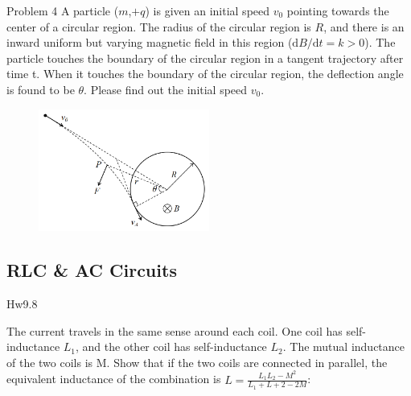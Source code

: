 \documentclass{beamer}
\begin{document}
\begin{frame}{Problem 4}
    A particle ($m$,$+q$) is given an initial speed $v_{0}$ pointing towards the center of a circular region. The radius of the circular region is $R$, and there is an inward uniform but varying magnetic field in this region ($\mathrm{d}B/\mathrm{d}t=k>0$). The particle touches the boundary of the circular region in a tangent trajectory after time t. When it touches the boundary of the circular region, the deflection angle is found to be $\theta$. Please find out the initial speed $v_{0}$.
 
\begin{figure}[H]
 \centering
 \includegraphics[width=0.5\textwidth]{images/015.png}
 \end{figure}
\end{frame}


\subsection{RLC \& AC Circuits}

\begin{frame}{Hw9.8}

The current travels in the same sense around each coil. One coil has self-inductance $L_1$, and the other coil has self-inductance $L_2$. The mutual inductance of the two coils is M. Show that if the two coils are connected in parallel, the equivalent inductance of the combination is $L = \frac{L_1L_2-M^2}{L_1+L+2-2M}$:

\end{frame}
\end{document}
